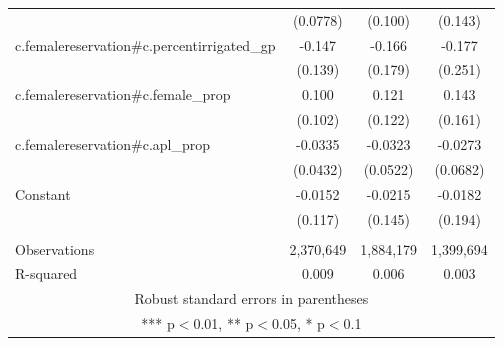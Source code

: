 \begin{tabular}{lccc}
 & (0.0778) & (0.100) & (0.143) \\
c.femalereservation\#c.percentirrigated\_gp & -0.147 & -0.166 & -0.177 \\
 & (0.139) & (0.179) & (0.251) \\
c.femalereservation\#c.female\_prop & 0.100 & 0.121 & 0.143 \\
 & (0.102) & (0.122) & (0.161) \\
c.femalereservation\#c.apl\_prop & -0.0335 & -0.0323 & -0.0273 \\
 & (0.0432) & (0.0522) & (0.0682) \\
Constant & -0.0152 & -0.0215 & -0.0182 \\
 & (0.117) & (0.145) & (0.194) \\
 &  &  &  \\
Observations & 2,370,649 & 1,884,179 & 1,399,694 \\
 R-squared & 0.009 & 0.006 & 0.003 \\ \hline
\multicolumn{4}{c}{ Robust standard errors in parentheses} \\
\multicolumn{4}{c}{ *** p$<$0.01, ** p$<$0.05, * p$<$0.1} \\
\end{tabular}

